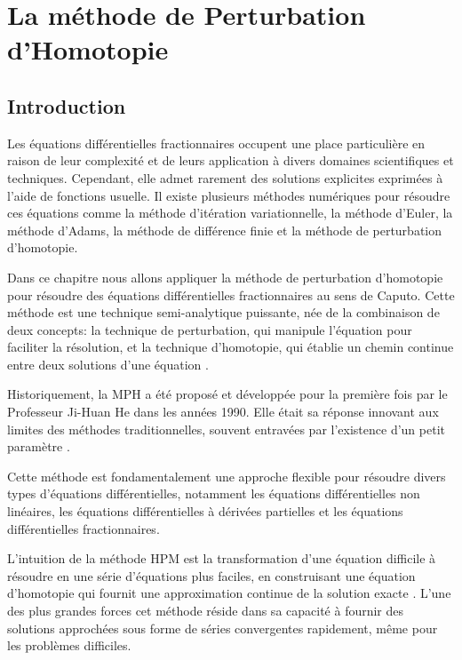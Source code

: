 

\chapter{La méthode de Perturbation d'Homotopie}
\label{chap:RN_EDF}
\pagestyle{fancy}

\section{Introduction}
Les équations différentielles fractionnaires occupent une place particulière en raison de leur complexité et de leurs application à divers domaines scientifiques et techniques. Cependant, elle admet rarement des solutions explicites exprimées à l'aide de fonctions usuelle.
Il existe plusieurs méthodes numériques pour résoudre ces équations comme la méthode d'itération variationnelle, la méthode d'Euler, la méthode d'Adams, la méthode de différence finie et la méthode de perturbation d'homotopie.

Dans ce chapitre nous allons appliquer la méthode de perturbation d'homotopie pour résoudre des équations différentielles fractionnaires au sens de Caputo. Cette méthode est une technique semi-analytique puissante, née de la combinaison de deux concepts: la technique de perturbation, qui manipule l'équation pour faciliter la résolution, et la technique d'homotopie, qui établie un chemin continue entre deux solutions d'une équation \cite{Advanced_Numerical}.

Historiquement, la MPH a été proposé et développée pour la première fois par le Professeur Ji-Huan He dans les années 1990. Elle était sa réponse innovant aux limites des méthodes traditionnelles, souvent entravées par l'existence d'un petit paramètre \cite{HPM_original}.

Cette méthode est fondamentalement une approche flexible pour résoudre divers types d'équations différentielles, notamment les équations différentielles non linéaires, les équations différentielles à dérivées partielles et les équations différentielles fractionnaires. 

L'intuition de la méthode HPM est la transformation d'une équation difficile à résoudre en une série d'équations plus faciles, en construisant une équation d'homotopie qui fournit une approximation continue de la solution exacte \cite{Advanced_Numerical}. L'une des plus grandes forces cet méthode réside dans sa capacité à fournir des solutions approchées sous forme de séries convergentes rapidement, même pour les problèmes difficiles.


